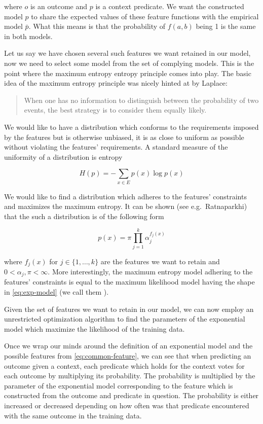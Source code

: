 where $o$ is an outcome and $p$ is a context predicate. We want the constructed
model $p$ to share the expected values of these feature functions with the
empirical model $\bar{p}$. What this means is that the probability of $f(a,b)$
being 1 is the same in both models.

Let us say we have chosen several such features we want retained in our model,
now we need to select some model from the set of complying models. This is the
point where the maximum entropy entropy principle comes into play. The basic
idea of the maximum entropy principle was nicely hinted at by Laplace:

\begin{quote}
When one has no information to distinguish between the probability of two
events, the best strategy is to consider them equally likely.
\end{quote}

We would like to have a distribution which conforms to the requirements imposed
by the features but is otherwise unbiased, it is as close to uniform as
possible without violating the features' requirements. A standard measure of
the uniformity of a distribution is entropy

\[
H(p) = -\sum_{x \in E} p(x) \log p(x)
\]

We would like to find a distribution which adheres to the features' constraints
and maximizes the maximum entropy. It can be shown (see e.g.\ Ratnaparkhi) that
the such a distribution is of the following form

\begin{equation}
\label{eq:exp-model}
p(x) = \pi \prod_{j=1}^k \alpha_j^{f_j(x)}
\end{equation}

where $f_j(x)$ for $j \in \{1,\dotsc,k\}$ are the features we want to retain
and $0 < \alpha_j,\pi < \infty$. More interestingly, the maximum entropy model
adhering to the features' constraints is equal to the maximum likelihood model
having the shape in \ref{eq:exp-model} (we call them ). 

Given the set of features we want to retain in our model, we can now employ an
unrestricted optimization algorithm to find the parameters of the exponential
model which maximize the likelihood of the training data.

Once we wrap our minds around the definition of an exponential model and the
possible features from \ref{eq:common-feature}, we can see that when predicting
an outcome given a context, each predicate which holds for the context votes
for each outcome by multiplying its probability. The probability is multiplied
by the parameter of the exponential model corresponding to the feature which
is constructed from the outcome and predicate in question. The probability is
either increased or decreased depending on how often was that predicate
encountered with the same outcome in the training data.

